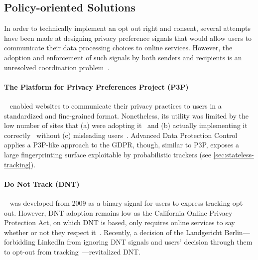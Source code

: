 \subsection{Policy-oriented Solutions}
\label{sec:policy-solutions}

In order to technically implement an opt out right and consent, several attempts have been made at designing privacy preference signals that would allow users to communicate their data processing choices to online services. However, the adoption and enforcement of such signals by both senders and recipients is an unresolved coordination problem~\cite{hilsPrivacyPreferenceSignals2021}.

\paragraph{The Platform for Privacy Preferences Project (P3P)}~\cite{reaglePlatformPrivacyPreferences1999,cranorPlatformPrivacyPreferences2002,cranorPlatformPrivacyPreferences2006} enabled websites to communicate their privacy practices to users in a standardized and fine-grained format. Nonetheless, its utility was limited by the low number of sites that (a) were adopting it~\cite{cranorUseP3PUser2002} and (b) actually implementing it correctly~\cite{cranorAnalysisP3PDeployment2003} without (c) misleading users~\cite{leonTokenAttemptMisrepresentation2010}. Advanced Data Protection Control~\cite{sustainablecomputinglabAdvancedDataProtection2022} applies a P3P-like approach to the GDPR, though, similar to P3P, exposes a large fingerprinting surface exploitable by probabilistic trackers (see \autoref{sec:stateless-tracking}).


\paragraph{Do Not Track (DNT)}~\cite{fieldingTrackingPreferenceExpression2019} was developed from 2009 as a binary signal for users to express tracking opt out. However, DNT adoption remains low as the California Online Privacy Protection Act, on which DNT is based, only requires online services to say whether or not they respect it~\cite{CaliforniaCodeBPC2003}. Recently, a decision of the Landgericht Berlin---forbidding LinkedIn from ignoring DNT signals and users' decision through them to opt-out from tracking~\cite{CourtProhibitsLinkedins2023}---revitalized DNT. 

